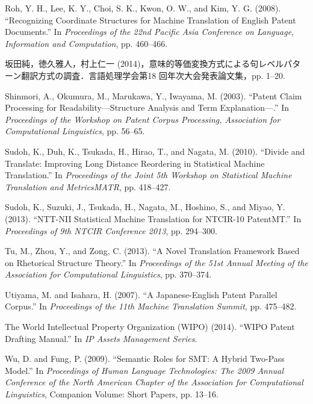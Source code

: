 \documentclass[japanese]{jnlp_1.4}
\begin{document}
\begin{thebibliography}{}
\item
Roh, Y. H., Lee, K. Y., Choi, S. K., Kwon, O. W., and Kim, Y. G. (2008). 
``Recognizing Coordi\-nate Structures for Machine Translation of English 
Patent Documents.'' In \textit{Proceedings of the 22nd Pacific Asia Conference on Language, Information and Computation}, pp. 460--466.

\item
坂田純，徳久雅人，村上仁一 (2014)，意味的等価変換方式による句レベルパターン翻訳方式の調査．言語処理学会第18 
回年次大会発表論文集，pp. 1--20.

\item
Shinmori, A., Okumura, M., Marukawa, Y., Iwayama, M. (2003). ``Patent Claim 
Processing for Readability---Structure Analysis and Term Explanation---.'' 
In \textit{Proceedings of the Workshop on Patent Corpus Processing, Association for Computational Linguistics}, pp. 56--65.

\item
Sudoh, K., Duh, K., Tsukada, H., Hirao, T., and Nagata, M. (2010). ``Divide 
and Translate: Improving Long Distance Reordering in Statistical Machine 
Translation.'' In \textit{Proceedings of the Joint 5th Workshop on Statistical Machine Translation and MetricsMATR}, pp. 418--427.

\item
Sudoh, K., Suzuki, J., Tsukada, H., Nagata, M., Hoshino, S., and Miyao, Y. 
(2013). ``NTT-NII Statistical Machine Translation for NTCIR-10 PatentMT.'' 
In \textit{Proceedings of 9th NTCIR Conference 2013}, pp. 294--300.

\item
Tu, M., Zhou, Y., and Zong, C. (2013). ``A Novel Translation Framework Based 
on Rhetorical Structure Theory.'' In \textit{Proceedings of the 51st Annual Meeting of the Association for Computational Linguistics}, pp. 370--374.

\item
Utiyama, M. and Isahara, H. (2007). ``A Japanese-English Patent Parallel 
Corpus.'' In \textit{Proceedings of the 11th Machine Translation Summit}, pp. 475--482.

\item
The World Intellectual Property Organization (WIPO) (2014). ``WIPO Patent 
Drafting Manual.'' In \textit{IP Assets Management Series}.

\item
Wu, D. and Fung, P. (2009). ``Semantic Roles for SMT: A Hybrid Two-Pass 
Model.'' In \textit{Proceedings of Human Language Technologies: The 2009 Annual Conference of the North American Chapter of the Association for Computational Linguistics}, Companion Volume: Short Papers, pp. 13--16.


\end{thebibliography}
\end{document}
